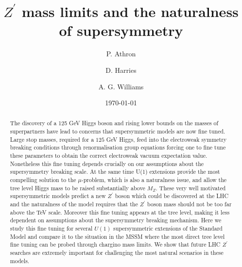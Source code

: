 \documentclass[preprint,amsmath,amssymb,aps,superscriptaddress,prd,showpacs,floatfix,nofootinbib]{revtex4-1}
\begin{document}
\title {$Z^\prime$ mass limits and the naturalness of supersymmetry}

\author{P. Athron}

\author{D. Harries}

\author{A. G. Williams}

\date{\today}%

\begin{abstract}

The discovery of a 125 GeV Higgs boson and rising lower bounds on the
masses of superpartners have lead to concerns that supersymmetric
models are now fine tuned.  Large stop masses, required for a $125$
GeV Higgs, feed into the electroweak symmetry breaking conditions 
through renormalisation group equations forcing one to fine tune these 
parameters to obtain the correct electroweak vacuum expectation value.  
Nonetheless this fine tuning depends crucially on our assumptions about 
the supersymmetry breaking scale.  At the same time U(1) extensions
provide the most compelling solution to the $\mu$-problem, which is also 
a naturalness issue, and allow the tree level Higgs mass to be raised substantially above $M_Z$. These very well motivated supersymmetric models 
predict a new $Z^\prime$ boson which could be discovered at the LHC and the
naturalness of the model requires that the $Z^\prime$ boson mass
should not be too far above the TeV scale.  Moreover this fine tuning
appears at the tree level, making it less dependent on assumptions
about the supersymmetry breaking mechanism.  Here we study this fine tuning for
several $U(1)$ supersymmetric extensions of the Standard Model and
compare it to the situation in the MSSM where the most direct tree
level fine tuning can be probed through chargino mass limits.  We show
that future LHC $Z^\prime$ searches are extremely important for
challenging the most natural scenarios in these models.









\end{abstract}
\end{document}
